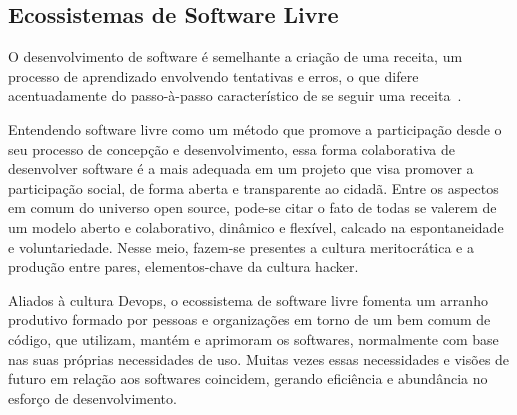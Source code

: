 \subsection{Ecossistemas de Software Livre}

O desenvolvimento de software é semelhante a criação de uma receita, um
processo de aprendizado envolvendo tentativas e erros, o que difere
acentuadamente do passo-à-passo característico de se seguir uma
receita~\cite{poppendieck2011}. 

Entendendo software livre como um método que promove a participação desde o seu
processo de concepção e desenvolvimento, essa forma colaborativa de desenvolver
software é a mais adequada em um projeto que visa promover a participação
social, de forma aberta e transparente ao cidadã. 
Entre os aspectos em comum do universo open source, pode-se citar o fato de todas se valerem de
um modelo aberto e colaborativo, dinâmico e flexível, calcado na espontaneidade e voluntariedade.
Nesse meio, fazem-se presentes a cultura meritocrática e a
produção entre pares, elementos-chave da cultura hacker.

Aliados à cultura Devops, o ecossistema de software livre fomenta um arranho produtivo  formado por pessoas e organizações em torno de um bem comum de código,
que utilizam, mantém e aprimoram os softwares, normalmente com base nas suas próprias necessidades de uso. Muitas vezes essas necessidades 
e visões de futuro em relação aos softwares coincidem, gerando eficiência e abundância no esforço de desenvolvimento.



